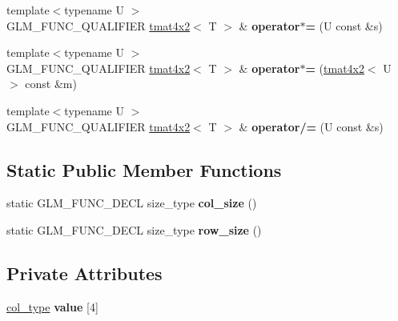 \begin{DoxyCompactItemize}
\item 
\hypertarget{structglm_1_1detail_1_1tmat4x2_ad73fae6782aa2a8b7513c7b04188dfbb}{}{\footnotesize template$<$typename U $>$ }\\G\+L\+M\+\_\+\+F\+U\+N\+C\+\_\+\+Q\+U\+A\+L\+I\+F\+I\+E\+R \hyperlink{structglm_1_1detail_1_1tmat4x2}{tmat4x2}$<$ T $>$ \& {\bfseries operator$\ast$=} (U const \&s)\label{structglm_1_1detail_1_1tmat4x2_ad73fae6782aa2a8b7513c7b04188dfbb}

\item 
\hypertarget{structglm_1_1detail_1_1tmat4x2_a433c0ce4ddf3f2721a7f5e064e179277}{}{\footnotesize template$<$typename U $>$ }\\G\+L\+M\+\_\+\+F\+U\+N\+C\+\_\+\+Q\+U\+A\+L\+I\+F\+I\+E\+R \hyperlink{structglm_1_1detail_1_1tmat4x2}{tmat4x2}$<$ T $>$ \& {\bfseries operator$\ast$=} (\hyperlink{structglm_1_1detail_1_1tmat4x2}{tmat4x2}$<$ U $>$ const \&m)\label{structglm_1_1detail_1_1tmat4x2_a433c0ce4ddf3f2721a7f5e064e179277}

\item 
\hypertarget{structglm_1_1detail_1_1tmat4x2_a15c7b65fbecf0e4d7cdf8699131c61db}{}{\footnotesize template$<$typename U $>$ }\\G\+L\+M\+\_\+\+F\+U\+N\+C\+\_\+\+Q\+U\+A\+L\+I\+F\+I\+E\+R \hyperlink{structglm_1_1detail_1_1tmat4x2}{tmat4x2}$<$ T $>$ \& {\bfseries operator/=} (U const \&s)\label{structglm_1_1detail_1_1tmat4x2_a15c7b65fbecf0e4d7cdf8699131c61db}

\end{DoxyCompactItemize}
\subsection*{Static Public Member Functions}
\begin{DoxyCompactItemize}
\item 
\hypertarget{structglm_1_1detail_1_1tmat4x2_a94ced6676f6709e4b71412eb27d19802}{}static G\+L\+M\+\_\+\+F\+U\+N\+C\+\_\+\+D\+E\+C\+L size\+\_\+type {\bfseries col\+\_\+size} ()\label{structglm_1_1detail_1_1tmat4x2_a94ced6676f6709e4b71412eb27d19802}

\item 
\hypertarget{structglm_1_1detail_1_1tmat4x2_aa505db7165ff6eae50386db0f4b8e435}{}static G\+L\+M\+\_\+\+F\+U\+N\+C\+\_\+\+D\+E\+C\+L size\+\_\+type {\bfseries row\+\_\+size} ()\label{structglm_1_1detail_1_1tmat4x2_aa505db7165ff6eae50386db0f4b8e435}

\end{DoxyCompactItemize}
\subsection*{Private Attributes}
\begin{DoxyCompactItemize}
\item 
\hypertarget{structglm_1_1detail_1_1tmat4x2_a220f170afeb321a5f1f01bddb3de245d}{}\hyperlink{structglm_1_1detail_1_1tvec2}{col\+\_\+type} {\bfseries value} \mbox{[}4\mbox{]}\label{structglm_1_1detail_1_1tmat4x2_a220f170afeb321a5f1f01bddb3de245d}

\end{DoxyCompactItemize}


